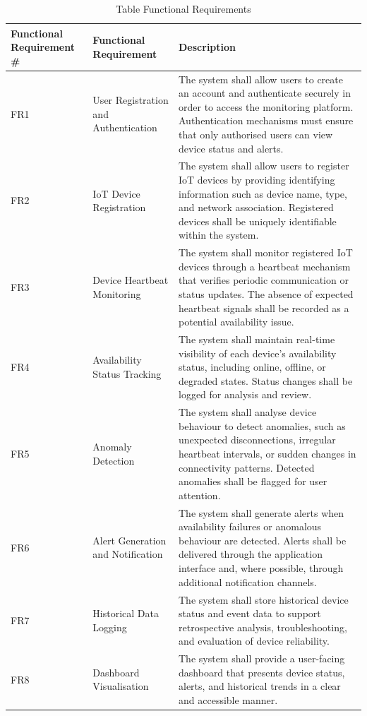 \begin{table}[htbp]
  \centering
  \small
  \caption{Table  Functional Requirements}
  \label{tab:ica2_2}
\begin{tabular}{p{}p{}p{}}
\toprule
Functional Requirement \# & Functional Requirement & Description \\
\midrule
FR1 & User Registration and Authentication & The system shall allow users to create an account and authenticate securely in order to access the monitoring platform. Authentication mechanisms must ensure that only authorised users can view device status and alerts. \\
FR2 & IoT Device Registration & The system shall allow users to register IoT devices by providing identifying information such as device name, type, and network association. Registered devices shall be uniquely identifiable within the system. \\
FR3 & Device Heartbeat Monitoring & The system shall monitor registered IoT devices through a heartbeat mechanism that verifies periodic communication or status updates. The absence of expected heartbeat signals shall be recorded as a potential availability issue. \\
FR4 & Availability Status Tracking & The system shall maintain real-time visibility of each device's availability status, including online, offline, or degraded states. Status changes shall be logged for analysis and review. \\
FR5 & Anomaly Detection & The system shall analyse device behaviour to detect anomalies, such as unexpected disconnections, irregular heartbeat intervals, or sudden changes in connectivity patterns. Detected anomalies shall be flagged for user attention. \\
FR6 & Alert Generation and Notification & The system shall generate alerts when availability failures or anomalous behaviour are detected. Alerts shall be delivered through the application interface and, where possible, through additional notification channels. \\
FR7 & Historical Data Logging & The system shall store historical device status and event data to support retrospective analysis, troubleshooting, and evaluation of device reliability. \\
FR8 & Dashboard Visualisation & The system shall provide a user-facing dashboard that presents device status, alerts, and historical trends in a clear and accessible manner. \\
\bottomrule
\end{tabular}
\end{table}

